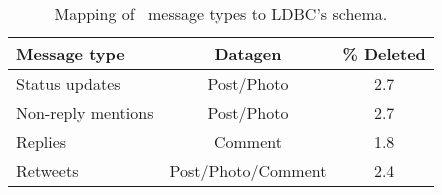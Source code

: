 \begin{table}[H]
  \centering
  \begin{tabular}{ |l|c|c| }
    \hline
    \textbf{Message type~\cite{DBLP:conf/cscw/AlmuhimediWLSA13}} & \textbf{Datagen} & \textbf{\% Deleted} \\
    \hline\hline
    Status updates & Post/Photo & 2.7 \\
    \hline
    Non-reply mentions &  Post/Photo & 2.7 \\
    \hline
    Replies & Comment & 1.8 \\
    \hline
    Retweets & Post/Photo/Comment & 2.4 \\
    \hline
  \end{tabular}
  \centering
  \caption{Mapping of~\cite{DBLP:conf/cscw/AlmuhimediWLSA13} message types to LDBC's schema.}
  \label{table:almuhimedi-mapping}
\end{table}
